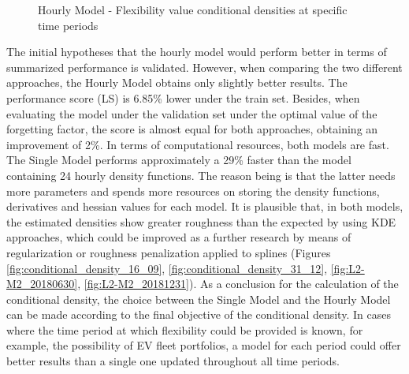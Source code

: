 \begin{figure}[htbp]
\centering    
{}
\caption{Hourly Model - Flexibility value conditional densities at specific time periods}
\label{fig:conditional_densities_L2}
\end{figure}


The initial hypotheses that the hourly model would perform better in terms of summarized performance is validated. However, when comparing the two different approaches, the Hourly Model obtains only slightly better results. The performance score (LS) is 6.85\% lower under the train set. Besides, when evaluating the model under the validation set under the optimal value of the forgetting factor, the score is almost equal for both approaches, obtaining an improvement of 2\%. In terms of computational resources, both models are fast. The Single Model performs approximately a 29\% faster than the model containing 24 hourly density functions. The reason being is that the latter needs more parameters and spends more resources on storing the density functions, derivatives and hessian values for each model.  It is plausible that, in both models, the estimated densities show greater roughness than the expected by using KDE approaches, which could be improved as a further research by means of regularization or roughness penalization applied to splines (Figures \ref{fig:conditional_density_16_09}, \ref{fig:conditional_density_31_12}, \ref{fig:L2-M2_20180630}, \ref{fig:L2-M2_20181231}).
As a conclusion for the calculation of the conditional density, the choice between the Single Model and the Hourly Model can be made according to the final objective of the conditional density. In cases where the time period at which flexibility could be provided is known, for example, the possibility of EV fleet portfolios, a model for each period could offer better results than a single one updated throughout all time periods. 

